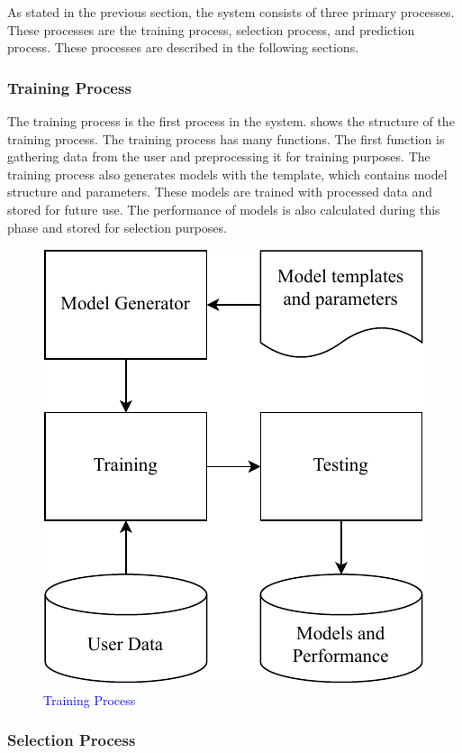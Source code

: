 \documentclass[a4paper,fleqn]{cas-dc}
\newcommand{\responsemodsm}[1]{\textcolor{blue}{#1}}
\newcommand{\captionb}[1]{\caption{\responsemodsm{#1}}}
\begin{document}
As stated in the previous section, the system consists of three primary processes. These processes are the training process, selection process, and prediction process. These processes are described in the following sections.

\subsubsection{Training Process}\label{subsubsec:training_process}

The training process is the first process in the system.  shows the structure of the training process. The training process has many functions. The first function is gathering data from the user and preprocessing it for training purposes. The training process also generates models with the template, which contains model structure and parameters. These models are trained with processed data and stored for future use. The performance of models is also calculated during this phase and stored for selection purposes.

\begin{figure}[ht]
    \centering
    \includegraphics[width=0.7\columnwidth]{training_and_testing.pdf}
    \captionb{Training Process}
    \label{fig:training_process}
\end{figure}

\subsubsection{Selection Process}\label{subsubsec:selection_process}
\end{document}
